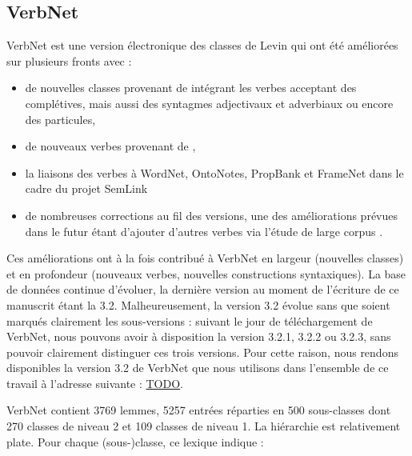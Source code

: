 \subsection{VerbNet}
\label{presentation_verbnet}

VerbNet \citep{kipperschuler2005verbnet} est une version électronique des
classes de Levin qui ont été améliorées sur plusieurs fronts avec :

\begin{itemize}

    \item de nouvelles classes provenant de \cite{korhonen2004extended}
        intégrant les verbes acceptant des complétives, mais aussi des
        syntagmes adjectivaux et adverbiaux ou encore des particules,

    \item de nouveaux verbes provenant de \cite{dorr2001lcs},

    \item la liaisons des verbes à WordNet, OntoNotes, PropBank et FrameNet
        dans le cadre du projet SemLink \citep{palmer2009semlink}

    \item de nombreuses corrections au fil des versions, une des améliorations
        prévues dans le futur étant d'ajouter d'autres verbes via l'étude de
        large corpus \citep{bonial2013expanding}.

\end{itemize}

Ces améliorations ont à la fois contribué à VerbNet en largeur (nouvelles
classes) et en profondeur (nouveaux verbes, nouvelles constructions
syntaxiques). La base de données continue d'évoluer, la dernière version au
moment de l'écriture de ce manuscrit étant la 3.2. Malheureusement, la version
3.2 évolue sans que soient marqués clairement les sous-versions : suivant le
jour de téléchargement de VerbNet, nous pouvons avoir à disposition la version
3.2.1, 3.2.2 ou 3.2.3, sans pouvoir clairement distinguer ces trois versions.
Pour cette raison, nous rendons disponibles la version 3.2 de VerbNet que nous
utilisons dans l'ensemble de ce travail à l'adresse suivante : \url{TODO}.

VerbNet contient 3769 lemmes, 5257 entrées réparties en 500 sous-classes dont
270 classes de niveau 2 et 109 classes de niveau 1. La hiérarchie est
relativement plate. Pour chaque (sous-)classe, ce lexique indique :

